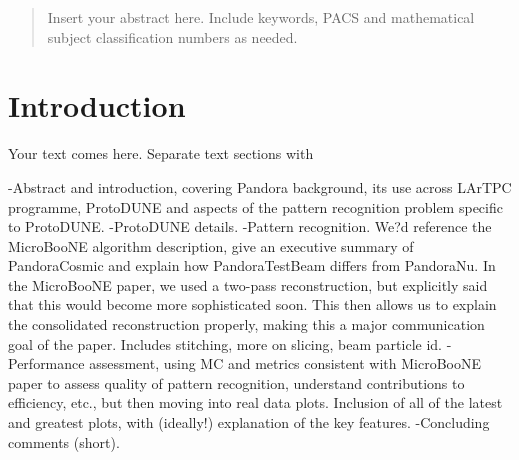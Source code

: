 
\date{Received: date / Accepted: date}


\maketitle

\begin{abstract}
Insert your abstract here. Include keywords, PACS and mathematical
subject classification numbers as needed.
\end{abstract}

\section{Introduction}
\label{intro}
Your text comes here. Separate text sections with

-Abstract and introduction, covering Pandora background, its use across LArTPC programme, ProtoDUNE and aspects of the pattern recognition problem specific to ProtoDUNE.
-ProtoDUNE details.
-Pattern recognition. We?d reference the MicroBooNE algorithm description, give an executive summary of PandoraCosmic and explain how PandoraTestBeam differs from PandoraNu. In the MicroBooNE paper, we used a two-pass reconstruction, but explicitly said that this would become more sophisticated soon. This then allows us to explain the consolidated reconstruction properly, making this a major communication goal of the paper. Includes stitching, more on slicing, beam particle id.
-Performance assessment, using MC and metrics consistent with MicroBooNE paper to assess quality of pattern recognition, understand contributions to efficiency, etc., but then moving into real data plots. Inclusion of all of the latest and greatest plots, with (ideally!) explanation of the key features.
-Concluding comments (short).

